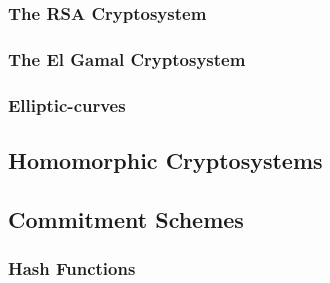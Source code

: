 \subsubsection{The RSA Cryptosystem}
\label{preliminaries:crypto_block:pub:rsa}

\subsubsection{The El Gamal Cryptosystem}
\label{preliminaries:crypto_block:pub:el_gamal}

\subsubsection{Elliptic-curves}
\label{preliminaries:crypto_block:pub:el_curves}

\subsection{Homomorphic Cryptosystems}
\label{preliminaries:crypto_block:homo}

\subsection{Commitment Schemes}
\label{preliminaries:crypto_block:comm}

\subsubsection{Hash Functions}
\label{preliminaries:crypto_block:pub:comm:hash}
